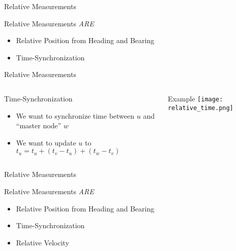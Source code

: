 \documentclass{beamer}
\begin{document}
\begin{frame}{Relative Measurements}
\begin{center}
Relative Measurements \emph{ARE}
\begin{itemize}
\item Relative Position from Heading and Bearing
\item Time-Synchronization 
\end{itemize}
\end{center}
\end{frame}

\begin{frame}{Relative Measurements}
\begin{columns}[T]
    \begin{column}{.5\textwidth}
     \begin{block}{Time-Synchronization}
        \begin{itemize}
            \item We want to synchronize time between $u$ and ``master node''
            $w$ 
            \item We want to update $u$ to $t_u = t_u + (t_v - t_u) + (t_w -
            t_v)$ 
        \end{itemize}
    \end{block}
    \end{column}
    \begin{column}{.5\textwidth}
    \begin{block}{Example}
    \texttt{[image: relative\_time.png]}
    \end{block}
    \end{column}
  \end{columns}
\end{frame}

\begin{frame}{Relative Measurements}
\begin{center}
Relative Measurements \emph{ARE}
\begin{itemize}
\item Relative Position from Heading and Bearing
\item Time-Synchronization 
\item Relative Velocity
\end{itemize}
\end{center}
\end{frame}
\end{document}
